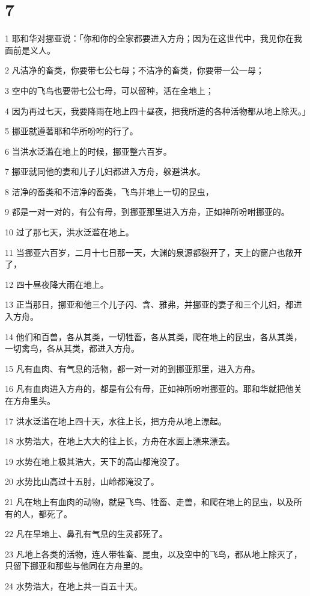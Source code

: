 \chapter{7}

\par 1 耶和华对挪亚说：「你和你的全家都要进入方舟；因为在这世代中，我见你在我面前是义人。
\par 2 凡洁净的畜类，你要带七公七母；不洁净的畜类，你要带一公一母；
\par 3 空中的飞鸟也要带七公七母，可以留种，活在全地上；
\par 4 因为再过七天，我要降雨在地上四十昼夜，把我所造的各种活物都从地上除灭。」
\par 5 挪亚就遵著耶和华所吩咐的行了。
\par 6 当洪水泛滥在地上的时候，挪亚整六百岁。
\par 7 挪亚就同他的妻和儿子儿妇都进入方舟，躲避洪水。
\par 8 洁净的畜类和不洁净的畜类，飞鸟并地上一切的昆虫，
\par 9 都是一对一对的，有公有母，到挪亚那里进入方舟，正如神所吩咐挪亚的。
\par 10 过了那七天，洪水泛滥在地上。
\par 11 当挪亚六百岁，二月十七日那一天，大渊的泉源都裂开了，天上的窗户也敞开了，
\par 12 四十昼夜降大雨在地上。
\par 13 正当那日，挪亚和他三个儿子闪、含、雅弗，并挪亚的妻子和三个儿妇，都进入方舟。
\par 14 他们和百兽，各从其类，一切牲畜，各从其类，爬在地上的昆虫，各从其类，一切禽鸟，各从其类，都进入方舟。
\par 15 凡有血肉、有气息的活物，都一对一对的到挪亚那里，进入方舟。
\par 16 凡有血肉进入方舟的，都是有公有母，正如神所吩咐挪亚的。耶和华就把他关在方舟里头。
\par 17 洪水泛滥在地上四十天，水往上长，把方舟从地上漂起。
\par 18 水势浩大，在地上大大的往上长，方舟在水面上漂来漂去。
\par 19 水势在地上极其浩大，天下的高山都淹没了。
\par 20 水势比山高过十五肘，山岭都淹没了。
\par 21 凡在地上有血肉的动物，就是飞鸟、牲畜、走兽，和爬在地上的昆虫，以及所有的人，都死了。
\par 22 凡在旱地上、鼻孔有气息的生灵都死了。
\par 23 凡地上各类的活物，连人带牲畜、昆虫，以及空中的飞鸟，都从地上除灭了，只留下挪亚和那些与他同在方舟里的。
\par 24 水势浩大，在地上共一百五十天。

